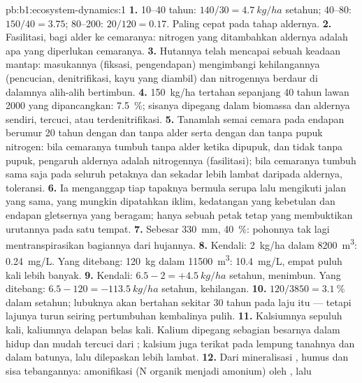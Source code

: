 \begin{solution}{pb:b1:ecosystem-dynamics:1}
\textbf{1.} 10--40 tahun: $140/30 = \qty{4.7}{kg/ha}$ setahun; 40--80:
$150/40 = \num{3.75}$; 80--200: $20/120 = \num{0.17}$. Paling cepat
pada tahap aldernya.
\textbf{2.} Fasilitasi, bagi alder ke cemaranya: nitrogen yang
ditambahkan aldernya adalah apa yang diperlukan cemaranya.
\textbf{3.} Hutannya telah mencapai sebuah keadaan mantap: masukannya
(fiksasi, pengendapan) mengimbangi kehilangannya (pencucian,
denitrifikasi, kayu yang diambil) dan nitrogennya berdaur di dalamnya
alih-alih bertimbun.
\textbf{4.} \qty{150}{kg/ha} tertahan sepanjang 40 tahun lawan
\num{2000} yang dipancangkan: \qty{7.5}{\%}; sisanya dipegang dalam
biomassa dan  aldernya sendiri, tercuci, atau terdenitrifikasi.
\textbf{5.} Tanamlah semai cemara pada endapan berumur 20 tahun dengan
dan tanpa alder serta dengan dan tanpa pupuk nitrogen: bila cemaranya
tumbuh tanpa alder ketika dipupuk, dan tidak tanpa pupuk, pengaruh
aldernya adalah nitrogennya (fasilitasi); bila cemaranya tumbuh sama
saja pada seluruh petaknya dan sekadar lebih lambat daripada aldernya,
toleransi.
\textbf{6.} Ia menganggap tiap tapaknya bermula serupa lalu mengikuti
jalan yang sama, yang mungkin dipatahkan iklim, kedatangan yang
kebetulan dan endapan gletsernya yang beragam; hanya sebuah petak
tetap yang membuktikan urutannya pada satu tempat.
\textbf{7.} Sebesar \qty{330}{mm}, \qty{40}{\%}: pohonnya tak lagi
mentranspirasikan bagiannya dari hujannya.
\textbf{8.} Kendali: \qty{2}{kg/ha} dalam \qty{8200}{m^3}: \qty{0.24}{mg/L}.
Yang ditebang: \qty{120}{kg} dalam \qty{11500}{m^3}: \qty{10.4}{mg/L},
empat puluh kali lebih banyak.
\textbf{9.} Kendali: $6.5 - 2 = +\qty{4.5}{kg/ha}$ setahun, menimbun.
Yang ditebang: $6.5 - 120 = -\qty{113.5}{kg/ha}$ setahun, kehilangan.
\textbf{10.} $120/3850 = \qty{3.1}{\%}$ dalam setahun; lubuknya akan
bertahan sekitar \num{30} tahun pada laju itu --- tetapi lajunya turun
seiring pertumbuhan kembalinya pulih.
\textbf{11.} Kalsiumnya sepuluh kali, kaliumnya delapan belas kali.
Kalium dipegang sebagian besarnya dalam  hidup dan mudah
tercuci dari ; kalsium juga terikat pada lempung tanahnya
dan dalam batunya, lalu dilepaskan lebih lambat.
\textbf{12.} Dari mineralisasi , humus dan sisa tebangannya:
amonifikasi (N organik menjadi amonium) oleh , lalu

\end{solution}
